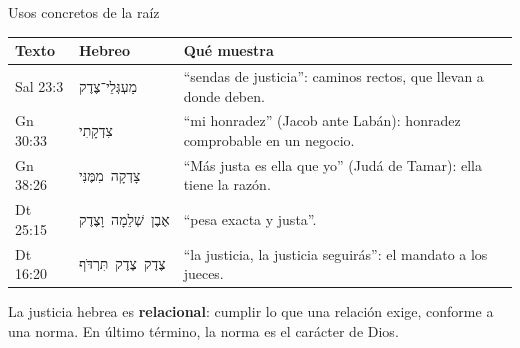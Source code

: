 \documentclass[hyperref={bookmarks=false},aspectratio=169]{beamer}
\newcommand{\heb}[1]{\mbox{\foreignlanguage{hebrew}{#1}}}
\newcommand{\destacar}[1]{\textbf{\textcolor{azul}{#1}}}
\begin{document}
\begin{frame}{Usos concretos de la raíz}
\scriptsize\renewcommand{\arraystretch}{1.25}
\begin{tabular}{@{}>{\RaggedRight\arraybackslash}p{2.0cm}>{\RaggedRight\arraybackslash}p{3.0cm}>{\RaggedRight\arraybackslash}p{7.0cm}@{}}
\toprule
\textbf{Texto} & \textbf{Hebreo} & \textbf{Qué muestra} \\ \midrule
Sal 23:3 & \heb{מַעְגְּלֵי־צֶדֶק} & ``sendas de justicia'': caminos rectos, que llevan a donde deben. \\
Gn 30:33 & \heb{צִדְקָתִי} & ``mi honradez'' (Jacob ante Labán): honradez comprobable en un negocio. \\
Gn 38:26 & \heb{צָדְקָה מִמֶּנִּי} & ``Más justa es ella que yo'' (Judá de Tamar): ella tiene la razón. \\
Dt 25:15 & \heb{אֶבֶן שְׁלֵמָה וָצֶדֶק} & ``pesa exacta y justa''. \\
Dt 16:20 & \heb{צֶדֶק צֶדֶק תִּרְדֹּף} & ``la justicia, la justicia seguirás'': el mandato a los jueces. \\
\bottomrule
\end{tabular}\par\bigskip
\begin{tcolorbox}[colback=papiro,colframe=dorado,boxrule=1pt,arc=3pt]
\small La justicia hebrea es \destacar{relacional}: cumplir lo que una relación exige, conforme a una norma. En último término, la norma es el carácter de Dios.
\end{tcolorbox}
\end{frame}
\end{document}
